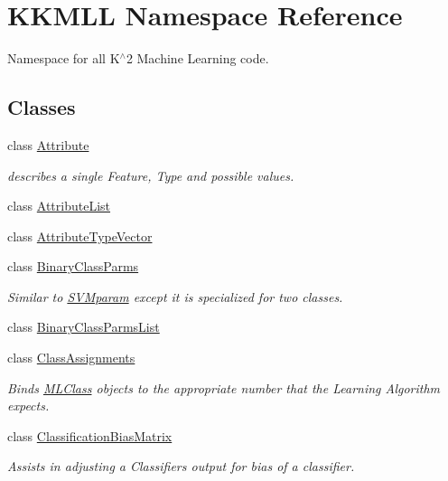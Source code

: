 \hypertarget{namespace_k_k_m_l_l}{}\section{K\+K\+M\+LL Namespace Reference}
\label{namespace_k_k_m_l_l}


Namespace for all K$^\wedge$2 Machine Learning code.  


\subsection*{Classes}
\begin{DoxyCompactItemize}
\item 
class \hyperlink{class_k_k_m_l_l_1_1_attribute}{Attribute}
\begin{DoxyCompactList}\small\item\em describes a single Feature, Type and possible values. \end{DoxyCompactList}\item 
class \hyperlink{class_k_k_m_l_l_1_1_attribute_list}{Attribute\+List}
\item 
class \hyperlink{class_k_k_m_l_l_1_1_attribute_type_vector}{Attribute\+Type\+Vector}
\item 
class \hyperlink{class_k_k_m_l_l_1_1_binary_class_parms}{Binary\+Class\+Parms}
\begin{DoxyCompactList}\small\item\em Similar to \hyperlink{class_k_k_m_l_l_1_1_s_v_mparam}{S\+V\+Mparam} except it is specialized for two classes. \end{DoxyCompactList}\item 
class \hyperlink{class_k_k_m_l_l_1_1_binary_class_parms_list}{Binary\+Class\+Parms\+List}
\item 
class \hyperlink{class_k_k_m_l_l_1_1_class_assignments}{Class\+Assignments}
\begin{DoxyCompactList}\small\item\em Binds \hyperlink{class_k_k_m_l_l_1_1_m_l_class}{M\+L\+Class} objects to the appropriate number that the Learning Algorithm expects. \end{DoxyCompactList}\item 
class \hyperlink{class_k_k_m_l_l_1_1_classification_bias_matrix}{Classification\+Bias\+Matrix}
\begin{DoxyCompactList}\small\item\em Assists in adjusting a Classifiers output for bias of a classifier. \end{DoxyCompactList}\item 

\end{DoxyCompactItemize}
